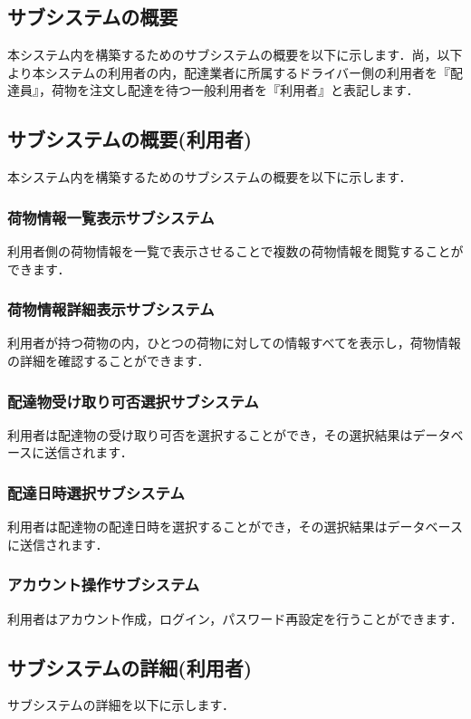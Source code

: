 \documentclass[a4j,titlepage]{jarticle}
\begin{document}
\subsection{サブシステムの概要}
本システム内を構築するためのサブシステムの概要を以下に示します．尚，以下より本システムの利用者の内，配達業者に所属するドライバー側の利用者を『配達員』，荷物を注文し配達を待つ一般利用者を『利用者』と表記します．

\subsection{サブシステムの概要(利用者)}
本システム内を構築するためのサブシステムの概要を以下に示します．

\subsubsection{荷物情報一覧表示サブシステム}
利用者側の荷物情報を一覧で表示させることで複数の荷物情報を閲覧することができます．

\subsubsection{荷物情報詳細表示サブシステム}
利用者が持つ荷物の内，ひとつの荷物に対しての情報すべてを表示し，荷物情報の詳細を確認することができます．

\subsubsection{配達物受け取り可否選択サブシステム}
利用者は配達物の受け取り可否を選択することができ，その選択結果はデータベースに送信されます．

\subsubsection{配達日時選択サブシステム}
利用者は配達物の配達日時を選択することができ，その選択結果はデータベースに送信されます．

\subsubsection{アカウント操作サブシステム}
利用者はアカウント作成，ログイン，パスワード再設定を行うことができます．

\subsection{サブシステムの詳細(利用者)}
サブシステムの詳細を以下に示します．
\end{document}
